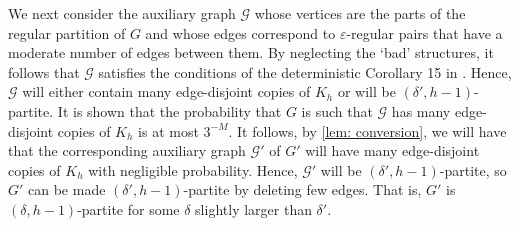\documentclass[11pt]{article}
\theoremstyle{plain}
\begin{document}
We next consider the auxiliary graph $\mathscr{G}$ whose vertices are the parts of the regular partition of $G$ and whose edges correspond to $\varepsilon$-regular pairs that have a moderate number of edges between them. By neglecting the `bad' structures, it follows that $\mathscr{G}$ satisfies the conditions of the deterministic Corollary 15 in \cite{luczak2000triangle}. Hence, $\mathscr{G}$ will either contain many edge-disjoint copies of $K_h$ or will be $(\delta', h-1)$-partite. It is shown that the probability that $G$ is such that $\mathscr{G}$ has many edge-disjoint copies of $K_h$ is at most $3^{-M}$. It follows, by \cref{lem: conversion}, we will have that the corresponding auxiliary graph $\mathscr{G}'$ of $G'$ will have many edge-disjoint copies of $K_h$ with negligible probability. Hence, $\mathscr{G}'$ will be $(\delta', h-1)$-partite, so $G'$ can be made $(\delta', h-1)$-partite by deleting few edges. That is, $G'$ is $(\delta, h-1)$-partite for some $\delta$ slightly larger than $\delta'$. 
\end{document}
